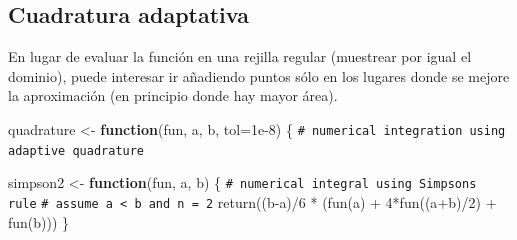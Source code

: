 \documentclass[
  10pt,
]{book}
\newenvironment{Shaded}{\begin{snugshade}}{\end{snugshade}}
\newcommand{\AttributeTok}[1]{\textcolor[rgb]{0.77,0.63,0.00}{#1}}
\newcommand{\CommentTok}[1]{\textcolor[rgb]{0.56,0.35,0.01}{\textit{#1}}}
\newcommand{\ControlFlowTok}[1]{\textcolor[rgb]{0.13,0.29,0.53}{\textbf{#1}}}
\newcommand{\DecValTok}[1]{\textcolor[rgb]{0.00,0.00,0.81}{#1}}
\newcommand{\FloatTok}[1]{\textcolor[rgb]{0.00,0.00,0.81}{#1}}
\newcommand{\FunctionTok}[1]{\textcolor[rgb]{0.00,0.00,0.00}{#1}}
\newcommand{\NormalTok}[1]{#1}
\newcommand{\OtherTok}[1]{\textcolor[rgb]{0.56,0.35,0.01}{#1}}
\newcommand{\SpecialCharTok}[1]{\textcolor[rgb]{0.00,0.00,0.00}{#1}}
\theoremstyle{break}
\theoremstyle{nonumberplain}
\renewcommand{\CommentTok}[1]{\textcolor[rgb]{0.41,0.41,0.41}{\texttt{#1}}}
\begin{document}
\hypertarget{cuadratura-adaptativa}{%
\subsection{Cuadratura adaptativa}\label{cuadratura-adaptativa}}

En lugar de evaluar la función en una rejilla regular (muestrear por igual el dominio),
puede interesar ir añadiendo puntos sólo en los lugares donde se mejore la aproximación
(en principio donde hay mayor área).

\begin{Shaded}
\begin{Highlighting}[]
\NormalTok{quadrature }\OtherTok{\textless{}{-}} \ControlFlowTok{function}\NormalTok{(fun, a, b, }\AttributeTok{tol=}\FloatTok{1e{-}8}\NormalTok{) \{}
    \CommentTok{\# numerical integration using adaptive quadrature}

\NormalTok{  simpson2 }\OtherTok{\textless{}{-}} \ControlFlowTok{function}\NormalTok{(fun, a, b) \{}
    \CommentTok{\# numerical integral using Simpson\textquotesingle{}s rule}
    \CommentTok{\# assume a \textless{} b and n = 2}
    \FunctionTok{return}\NormalTok{((b}\SpecialCharTok{{-}}\NormalTok{a)}\SpecialCharTok{/}\DecValTok{6} \SpecialCharTok{*}\NormalTok{ (}\FunctionTok{fun}\NormalTok{(a) }\SpecialCharTok{+} \DecValTok{4}\SpecialCharTok{*}\FunctionTok{fun}\NormalTok{((a}\SpecialCharTok{+}\NormalTok{b)}\SpecialCharTok{/}\DecValTok{2}\NormalTok{) }\SpecialCharTok{+} \FunctionTok{fun}\NormalTok{(b)))}
\NormalTok{  \}}
 

\end{Highlighting}
\end{Shaded}
\end{document}
